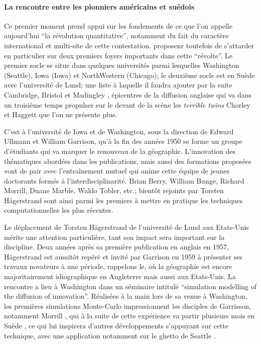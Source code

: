 \paragraph{La rencontre entre les pionniers américains et suédois}

Ce premier moment prend appui sur les fondements de ce que l'on appelle aujourd'hui \enquote{la révolution quantitative}, notamment du fait du caractère international et multi-site de cette contestation. \textcite{Gould2004} proposenr toutefois de s'attarder en particulier sur deux premiers foyers importants dans cette \enquote{révolte}. Le premier socle se situe dans quelques universités \autocite{Gould2004} parmi lesquelles Washington (Seattle), Iowa (Iowa) et NorthWestern (Chicago); le deuxième socle est en Suède avec l'université de Lund; une liste à laquelle il faudra ajouter par la suite Cambridge, Bristol et Madingley \autocite{Haggett1989}, épicentres de la diffusion anglaise \autocites{Whitehand1970} qui va dans un troisième temps propulser sur le devant de la scène les \textit{terrible twins} Chorley et Haggett que l'on ne présente plus.

C'est à l'université de Iowa et de Washington, sous la direction de Edward Ullmann et William Garrison, qu'à la fin des années 1950 se forme un groupe d'étudiants qui va marquer le renouveau de la géographie. L'innovation des thématiques abordées dans les publications, mais aussi des formations proposées vont de pair avec l’entraînement mutuel qui anime cette équipe de jeunes doctorants formés à l'interdisciplinarité. Brian Berry, William Bunge, Richard Morrill, Duane Marble, Waldo Tobler, etc.; bientôt rejoints par Torsten Hägerstrand sont ainsi parmi les premiers à mettre en pratique les techniques computationnelles les plus récentes.

Le déplacement de Torsten Hägerstrand de l'université de Lund aux Etats-Unis mérite une attention particulière, tant son impact sera important sur la discipline. Deux années après sa première publication en anglais en 1957, Hägerstrand est aussitôt repéré et invité par Garrison en 1959 à présenter ses travaux novateurs à une période, rappelons le, où la géographie est encore majoritairement idiographique en Angleterre mais aussi aux Etats-Unis. La rencontre a lieu à Washington dans un séminaire intitulé \foreignquote{english}{simulation modelling of the diffusion of innovation}. Réalisées à la main lors de sa venue à Washington, les premières simulations Monte-Carlo impressionnent les disciples de Garrisson, notamment Morrill \autocite[120]{Unwin1992}, qui à la suite de cette expérience va partir plusieurs mois en Suède \autocite{Morril2005}, ce qui lui inspirera d'autres développements s'appuyant sur cette technique, avec une application notamment sur le ghetto de Seattle \autocite{Marble1972}.

